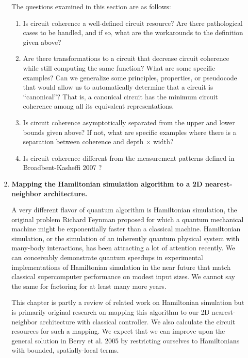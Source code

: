 \documentclass[]{article}
\theoremstyle{plain} \newtheorem{lemma}{Lemma}
\begin{document}
\begin{enumerate}
The questions examined in this section are as follows:

\begin{enumerate}
\item
Is circuit coherence a well-defined circuit resource? Are there pathological
cases to be handled, and if so, what are the workarounds to the definition
given above?

\item
Are there transformations to a circuit that decrease circuit coherence while
still computing the same function? What are some specific examples? Can we
generalize some principles, properties, or pseudocode that would allow us to
automatically determine that a circuit is ``canonical''?
That is, a canonical circuit has the minimum circuit coherence among
all its equivalent representations.

\item
Is circuit coherence asymptotically separated from the upper and lower bounds
given above? If not, what are specific examples where there is a separation
between coherence and depth $\times$ width? 

\item
Is circuit coherence different from the measurement patterns defined in
Broadbent-Kasheffi 2007 \cite{Broadbent2007} ?

\end{enumerate}


\item
\textbf{Mapping the Hamiltonian simulation algorithm to a 2D nearest-neighbor
architecture.}

A very different flavor of quantum algorithm is Hamiltonian simulation, the
original problem Richard Feynman proposed for which a quantum mechanical
machine might be exponentially faster than a classical machine. Hamiltonian
simulation, or the simulation of an inherently quantum physical system
with many-body interactions, has been attracting a lot of attention recently.
We can
conceivably demonstrate quantum speedups in experimental implementations
of Hamiltonian simulation in the
near future that match classical supercomputer performance on modest input
sizes. We cannot say the same for factoring for at least many more years.

This chapter is partly a review of related work on Hamiltonian simulation
but is primarily original research on mapping this algorithm to our 2D
nearest-neighbor architecture with classical controller. We also calculate
the circuit resources for such a mapping. We expect that we can improve
upon the general solution in Berry et al. 2005 \cite{Berry2006}
by restricting ourselves to Hamiltonians with
bounded, spatially-local terms.


\end{enumerate}
\end{document}
